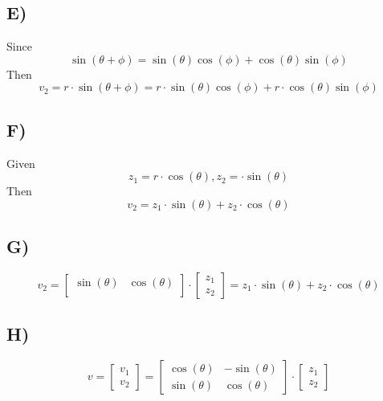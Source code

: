 \documentclass{article}
\begin{document}
\subsection*{E)}
Since
$$
	\sin(\theta + \phi) = \sin(\theta) \cos(\phi) + \cos(\theta) \sin(\phi)
$$
Then
$$
	v_2 = r \cdot \sin(\theta + \phi) = r \cdot \sin(\theta) \cos(\phi) + r \cdot \cos(\theta) \sin(\phi)
$$

\subsection*{F)}
Given
\[
	z_1 = r \cdot \cos(\theta) ,
	z_2 = \cdot \sin(\theta)
\]
Then
\[
	v_2 = z_1 \cdot \sin(\theta) + z_2 \cdot \cos(\theta)
\]
\subsection*{G)}

\[
	v_2 = \begin{bmatrix}
		\sin(\theta) & \cos(\theta) \\
	\end{bmatrix}
	\cdot
	\begin{bmatrix}
		z_1 \\
		z_2
	\end{bmatrix}
	=
	z_1 \cdot \sin(\theta) + z_2 \cdot \cos(\theta)
\]

\subsection*{H)}

\[
	v = \begin{bmatrix}
		v_1 \\
		v_2
	\end{bmatrix}
	=
	\begin{bmatrix}
		\cos(\theta) & - \sin(\theta) \\
		\sin(\theta) & \cos(\theta)
	\end{bmatrix}
	\cdot
	\begin{bmatrix}
		z_1 \\
		z_2
	\end{bmatrix}
\]
\end{document}
